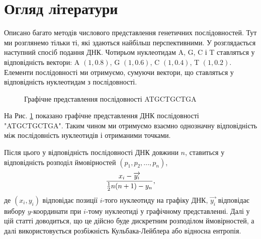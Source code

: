 \documentclass[14pt,a4paper,titlepage]{extarticle}
\begin{document}
\section{Огляд літератури}
Описано багато методів числового представлення генетичних послідовностей. Тут ми розглянемо тільки ті, які здаються найбільш перспективними. У \cite{l1} розглядається наступний спосіб подання ДНК. Чотирьом нуклеотидам A, G, C і T ставляться у відповідність вектори: A $(1,0.8)$, G $(1,0.6)$, C $(1,0.4)$, T $(1,0.2)$. Елементи послідовності ми отримуємо, сумуючи вектори, що ставляться у відповідність нуклеотидам з послідовності.\par
\begin{figure}[h!]
\begin{center}
\end{center}
\caption{Графічне представлення послідовності ATGCTGCTGA}
\label{fig:1}
\end{figure}
На Рис. \ref{fig:1} показано графічне представлення ДНК послідовності "ATGCTGCTGA". Таким чином ми отримуємо взаємно однозначну відповідність між послідовність нуклеотидів і отриманими точками.\par
Після цього у відповідність послідовності ДНК довжини $n$, ставиться у відповідність розподіл ймовірностей $(p_1,p_2,...,p_n)$,
\[{x_i-\overrightarrow{y_i} \over{{1\over2}n(n+1)-y_n}},\]
де $(x_i,y_i)$ відповідає позиції $i$-того нуклеотиду на графіку ДНК, $\overrightarrow{y_i}$ відповідає вибору $y$-координати при $i$-тому нуклеотиді у графічному представленні. Далі у цій статті доводиться, що це дійсно буде дискретним розподілом ймовірностей, а далі використовується розбіжність Кульбака-Лейблера або відносна ентропія.\par
\end{document}
